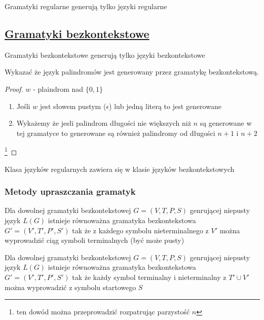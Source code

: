 	\begin{tw}
		Gramatyki regularne generują tylko języki regularne
		
\subsection{\href{http://pl.wikipedia.org/wiki/Gramatyka_bezkontekstowa}{Gramatyki bezkontekstowe}}
	\end{tw}		
		\begin{tw}
		Gramatyki bezkontekstowe generują tylko języki bezkontekstowe
	\end{tw}		
	
	\begin{przyklad}
		Wykazać że język palindromów jest generowany przez gramatykę bezkontekstową.
	\begin{proof}
		$w$ - plaindrom nad $\{0,1\}$ \\
		\begin{enumerate}
			\item Jeśli $w$ jest słowem pustym ($\epsilon$) lub jedną literą to jest generowane
			\item Wykażemy że jesłi palindrom długości nie większych niż $n$ są generowane w tej gramatyce to
			generowane są również palindromy od długości $n+1$ i $n+2$\\
		\end{enumerate}\footnote{ten dowód można przeprowadzić rozpatrując parzystość $n$}
	\end{proof}
	\end{przyklad}		
	
	\begin{tw}
	Klasa języków regularnych zawiera się w klasie języków bezkontekstowych
	\end{tw}
	
	\subsubsection{Metody upraszczania gramatyk}
	
	\begin{lemat}
		Dla dowolnej gramatyki bezkontekstowej $G = (V, T, P, S)$ genrującej niepusty język $L(G)$ istnieje równoważna gramatyka
		bezkontekstowa $G' = (V', T', P', S')$ tak że z każdego symbolu nieterminalnego z $V'$ można wyprowadzić ciąg symboli terminalnych (być może pusty)
	\end{lemat}	
	
	\begin{lemat}
		Dla dowolnej gramatyki bezkontekstowej $G = (V, T, P, S)$ genrującej niepusty język $L(G)$ istnieje równoważna gramatyka
		bezkontekstowa $G' = (V', T', P', S')$ tak że każdy symbol terminalny i nieterminalny z $T' \cup V'$ można wyprowadzić
		z  symbolu startowego $S$
	\end{lemat}		
	
